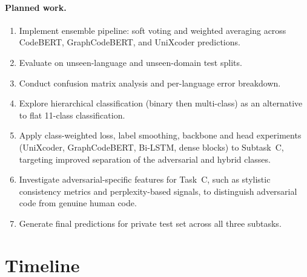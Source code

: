 \documentclass[11pt]{article}
\begin{document}
\paragraph{Planned work.}
\begin{enumerate}
    \item Implement ensemble pipeline: soft voting and weighted averaging across CodeBERT, GraphCodeBERT, and UniXcoder predictions.
    \item Evaluate on unseen-language and unseen-domain test splits.
    \item Conduct confusion matrix analysis and per-language error breakdown.
    \item Explore hierarchical classification (binary then multi-class) as an alternative to flat 11-class classification.
    \item Apply class-weighted loss, label smoothing, backbone and head experiments (UniXcoder, GraphCodeBERT, Bi-LSTM, dense blocks) to Subtask~C, targeting improved separation of the adversarial and hybrid classes.
    \item Investigate adversarial-specific features for Task~C, such as stylistic consistency metrics and perplexity-based signals, to distinguish adversarial code from genuine human code.
    \item Generate final predictions for private test set  across all three subtasks.
\end{enumerate}

\section{Timeline}
\label{sec:timeline}
\end{document}
